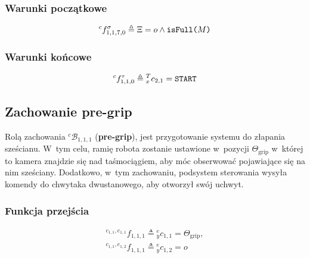 \subsubsection{Warunki początkowe}
\begin{equation}
    {}^{c}f^{\sigma}_{1,1,7,0} \triangleq \Xi = o \land \text{\texttt{isFull($M$)}}
\end{equation}

\subsubsection{Warunki końcowe}
\begin{equation}
    {}^{c}f^{\tau}_{1,1,0} \triangleq {}^{T}_{x}c_{2,1} = \text{\texttt{START}}
\end{equation}


\subsection{Zachowanie pre-grip}
\label{subsec:cs-pre-grip}

Rolą zachowania ${}^{c}\mathcal{B}_{1,1,1}$ (\textbf{pre-grip}), jest przygotowanie systemu do złapania sześcianu. W~tym celu, ramię robota zostanie ustawione w~pozycji $\Theta_{\mathrm{grip}}$ w~której to kamera znajdzie się nad taśmociągiem, aby móc obserwować pojawiające się na nim sześciany. Dodatkowo, w~tym zachowaniu, podsystem sterowania wysyła komendy do chwytaka dwustanowego, aby otworzył swój uchwyt.

\subsubsection{Funkcja przejścia}
\begin{equation}
    \begin{gathered}
        {}^{c_{1,1}, e_{1,1}}f_{1,1,1} \triangleq {}^{e}_{y}c_{1,1} = \Theta_{\mathrm{grip}},
        \\
        {}^{c_{1,1}, e_{1,2}}f_{1,1,1} \triangleq {}^{e}_{y}c_{1,2} = o
    \end{gathered}
\end{equation}
    
